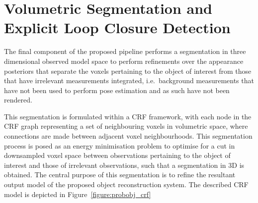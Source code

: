\section{Volumetric Segmentation and Explicit Loop Closure Detection}
The final component of the proposed pipeline performs a segmentation in three
dimensional observed model space to perform refinements over the appearance
posteriors that separate the voxels pertaining to the object of interest from
those that have irrelevant measurements integrated, i.e.\ background measurements
that have not been used to perform pose estimation and as such have not been rendered.

This segmentation is formulated within a CRF framework, with each node in the
CRF graph representing a set of neighbouring voxels in volumetric space, where connections
are made between adjacent voxel neighbourhoods. This segmentation process is
posed as an energy minimisation problem to optimise for a cut in downsampled
voxel space between observations pertaining to the object of interest and those
of irrelevant observations, such that a segmentation in 3D is obtained. The
central purpose of this segmentation is to refine the resultant output model of
the proposed object reconstruction system. The described CRF model is depicted
in Figure~\ref{figure:probobj_crf}

